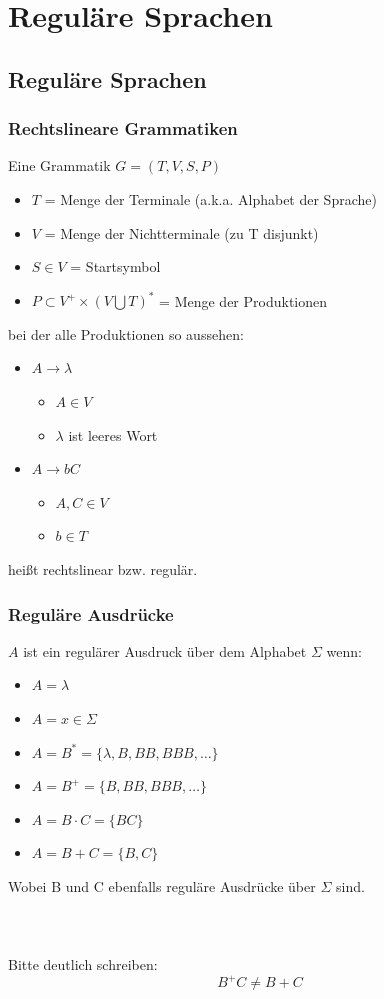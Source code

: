 \section{Reguläre Sprachen}
\subsection{Reguläre Sprachen}
\begin{frame}
\frametitle{Rechtslineare Grammatiken}
Eine Grammatik $G = ( T, V, S, P)$
\begin{itemize}
	\item $T$ = Menge der Terminale (a.k.a. Alphabet der Sprache)
	\item $V$ = Menge der Nichtterminale (zu T disjunkt)
	\item $S \in V$ = Startsymbol
	\item $P \subset V^{+} \times (V \bigcup T)^{*}$ = Menge der Produktionen
\end{itemize}
bei der alle Produktionen so aussehen:
\begin{itemize}
	\item $A \rightarrow \lambda$
	\begin{itemize}
		\item $A \in V$
		\item $\lambda$ ist leeres Wort
	\end{itemize}
	\item $A \rightarrow bC$
	\begin{itemize}
		\item $A, C \in V$
		\item $b \in T$
	\end{itemize}
\end{itemize}
heißt rechtslinear bzw. regulär. 
\end{frame}

\begin{frame}
\frametitle{Reguläre Ausdrücke}
$A$ ist ein regulärer Ausdruck über dem Alphabet $\Sigma$ wenn:
\begin{itemize}
	\item $A = \lambda$
	\item $A = x \in \Sigma$
	\item $A = B^{*} = \{\lambda, B, BB, BBB, \ldots\}$
	\item $A = B^{+} = \{B, BB, BBB, \ldots\}$
	\item $A = B \cdot C = \{BC\}$
	\item $A = B + C = \{B, C\}$
\end{itemize}
Wobei B und C ebenfalls reguläre Ausdrücke über $\Sigma$ sind.
~\\~\\~\\~\\

Bitte deutlich schreiben:
\begin{equation*}
B^{+}C \neq B + C
\end{equation*}
\end{frame}

